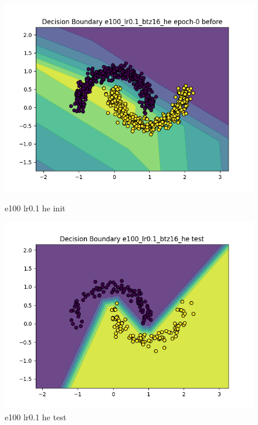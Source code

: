 \documentclass[8pt]{article}
\begin{document}
\begin{figure}[H]
    \centering
    \begin{minipage}{0.32\textwidth}
        \centering
        \includegraphics[width=\textwidth]{../Prob4/out/1024_173617/e100_lr0.1_btz16_he/decision_boundary_epoch-0 before.png}
        \caption{e100 lr0.1 he init}
        \label{fig:e100 lr0.1 he init}
    \end{minipage}
    \begin{minipage}{0.32\textwidth}
        \centering
        \includegraphics[width=\textwidth]{../Prob4/out/1024_173617/e100_lr0.1_btz16_he/decision_boundary_test.png}
        \caption{e100 lr0.1 he test}
        \label{fig:e100 lr0.1 he test}
    \end{minipage}

\end{figure}
\end{document}
